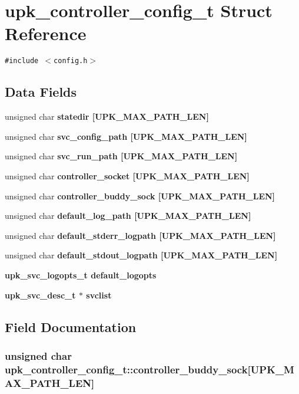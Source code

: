 \section{upk\_\-controller\_\-config\_\-t Struct Reference}
\label{structupk__controller__config__t}
{\tt \#include $<$config.h$>$}

\subsection*{Data Fields}
\begin{CompactItemize}
\item 
unsigned char \bf{statedir} [UPK\_\-MAX\_\-PATH\_\-LEN]
\item 
unsigned char \bf{svc\_\-config\_\-path} [UPK\_\-MAX\_\-PATH\_\-LEN]
\item 
unsigned char \bf{svc\_\-run\_\-path} [UPK\_\-MAX\_\-PATH\_\-LEN]
\item 
unsigned char \bf{controller\_\-socket} [UPK\_\-MAX\_\-PATH\_\-LEN]
\item 
unsigned char \bf{controller\_\-buddy\_\-sock} [UPK\_\-MAX\_\-PATH\_\-LEN]
\item 
unsigned char \bf{default\_\-log\_\-path} [UPK\_\-MAX\_\-PATH\_\-LEN]
\item 
unsigned char \bf{default\_\-stderr\_\-logpath} [UPK\_\-MAX\_\-PATH\_\-LEN]
\item 
unsigned char \bf{default\_\-stdout\_\-logpath} [UPK\_\-MAX\_\-PATH\_\-LEN]
\item 
\bf{upk\_\-svc\_\-logopts\_\-t} \bf{default\_\-logopts}
\item 
\bf{upk\_\-svc\_\-desc\_\-t} $\ast$ \bf{svclist}
\end{CompactItemize}


\subsection{Field Documentation}
\subsubsection{\setlength{\rightskip}{0pt plus 5cm}unsigned char \bf{upk\_\-controller\_\-config\_\-t::controller\_\-buddy\_\-sock}[UPK\_\-MAX\_\-PATH\_\-LEN]}\label{structupk__controller__config__t_80cbbca95c3ee048e79064a54a69444f}


